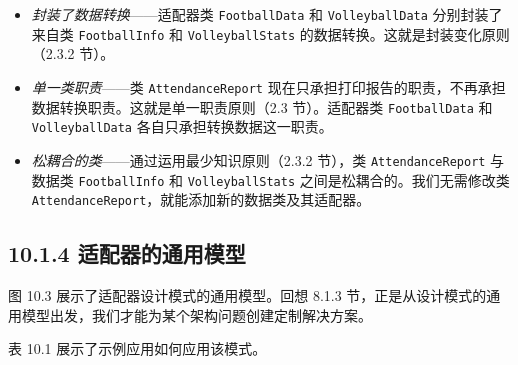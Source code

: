\begin{itemize}
\item \emph{封装了数据转换}——适配器类 \texttt{Football\allowbreak{}Data} 和 \texttt{Volleyball\allowbreak{}Data} 分别封装了来自类 \texttt{Football\allowbreak{}Info} 和 \texttt{Volleyball\allowbreak{}Stats} 的数据转换。这就是封装变化原则（2.3.2 节）。
\item \emph{单一类职责}——类 \texttt{Attendance\allowbreak{}Report} 现在只承担打印报告的职责，不再承担数据转换职责。这就是单一职责原则（2.3 节）。适配器类 \texttt{Football\allowbreak{}Data} 和 \texttt{Volleyball\allowbreak{}Data} 各自只承担转换数据这一职责。
\item \emph{松耦合的类}——通过运用最少知识原则（2.3.2 节），类 \texttt{Attendance\allowbreak{}Report} 与数据类 \texttt{Football\allowbreak{}Info} 和 \texttt{Volleyball\allowbreak{}Stats} 之间是松耦合的。我们无需修改类 \texttt{Attendance\allowbreak{}Report}，就能添加新的数据类及其适配器。
\end{itemize}

\subsection{10.1.4 适配器的通用模型}

图 10.3 展示了适配器设计模式的通用模型。回想 8.1.3 节，正是从设计模式的通用模型出发，我们才能为某个架构问题创建定制解决方案。


表 10.1 展示了示例应用如何应用该模式。

